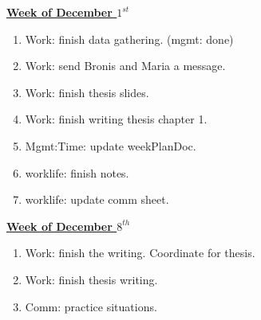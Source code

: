 \documentclass[11pt]{article}
\begin{document}

           {\small \underline{\textbf{Week of December $1^{st}$}}}
           \begin{enumerate}
             \tiny \item \tiny Work: finish data gathering. (mgmt: done)
           \item \tiny Work: send Bronis and Maria a message.
           \item \tiny Work: finish thesis slides.
           \item \tiny Work: finish writing thesis chapter 1.
           \item \tiny Mgmt:Time: update weekPlanDoc.
           \item \tiny worklife: finish notes.
           \item \tiny worklife: update comm sheet.
           \end{enumerate}
           
          {\small \underline{\textbf{Week of December $8^{th}$}}}
             \begin{enumerate}
               \tiny \item \tiny Work: finish the writing. Coordinate for thesis.
             \item \tiny Work: finish thesis writing. 
             \item \tiny Comm: practice situations. 
             \end{enumerate}
           
\end{document}
